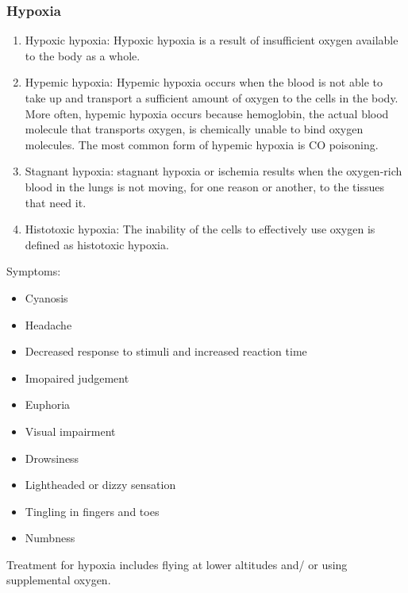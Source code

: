 \documentclass[12pt]{article}
\begin{document}
		\subsubsection{Hypoxia}
			\begin{enumerate}
				\item Hypoxic hypoxia: Hypoxic hypoxia is a result of insufficient oxygen available to the body as a whole.
				\item Hypemic hypoxia: Hypemic hypoxia occurs when the blood is not able to take up and transport a sufficient amount of oxygen to the cells in the body. More often, hypemic hypoxia occurs because hemoglobin, the actual blood molecule that transports oxygen, is chemically unable to bind oxygen molecules. The most common form of hypemic hypoxia is CO poisoning.
				\item Stagnant hypoxia:  stagnant hypoxia or ischemia results when the oxygen-rich blood in the lungs is not moving, for one reason or another, to the tissues that need it. 
				\item Histotoxic hypoxia: The inability of the cells to effectively use oxygen is defined as histotoxic hypoxia. 
			\end{enumerate}
			Symptoms:
			\begin{multicols}{2}
				\begin{itemize}
					\item Cyanosis
					\item Headache
					\item Decreased response to stimuli and increased reaction time
					\item Imopaired judgement
					\item Euphoria
					\item Visual impairment
					\item Drowsiness
					\item Lightheaded or dizzy sensation
					\item Tingling in fingers and toes
					\item Numbness
				\end{itemize}
			\end{multicols}
			Treatment for hypoxia includes flying at lower altitudes and/ or using supplemental oxygen.
\end{document}
